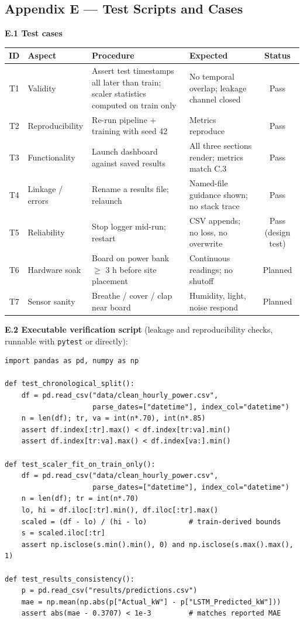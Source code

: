 \documentclass[11pt,a4paper]{article}
\begin{document}
\subsection{Appendix E --- Test Scripts and Cases}
\noindent\textbf{E.1 Test cases}\par\smallskip
\begin{tabular}{|c|l|p{5.6cm}|p{3.4cm}|c|}
\hline
\textbf{ID} & \textbf{Aspect} & \textbf{Procedure} & \textbf{Expected} & \textbf{Status}\\ \hline
T1 & Validity & Assert test timestamps all later than train; scaler statistics computed on train only & No temporal overlap; leakage channel closed & Pass\\ \hline
T2 & Reproducibility & Re-run pipeline $+$ training with seed 42 & Metrics reproduce & Pass\\ \hline
T3 & Functionality & Launch dashboard against saved results & All three sections render; metrics match C.3 & Pass\\ \hline
T4 & Linkage / errors & Rename a results file; relaunch & Named-file guidance shown; no stack trace & Pass\\ \hline
T5 & Reliability & Stop logger mid-run; restart & CSV appends; no loss, no overwrite & Pass (design test)\\ \hline
T6 & Hardware soak & Board on power bank $\geq$ 3 h before site placement & Continuous readings; no shutoff & Planned\\ \hline
T7 & Sensor sanity & Breathe / cover / clap near board & Humidity, light, noise respond & Planned\\ \hline
\end{tabular}
\bigskip

\noindent\textbf{E.2 Executable verification script} (leakage and
reproducibility checks, runnable with \texttt{pytest} or directly):\par
\begin{verbatim}
import pandas as pd, numpy as np

def test_chronological_split():
    df = pd.read_csv("data/clean_hourly_power.csv",
                     parse_dates=["datetime"], index_col="datetime")
    n = len(df); tr, va = int(n*.70), int(n*.85)
    assert df.index[:tr].max() < df.index[tr:va].min()
    assert df.index[tr:va].max() < df.index[va:].min()

def test_scaler_fit_on_train_only():
    df = pd.read_csv("data/clean_hourly_power.csv",
                     parse_dates=["datetime"], index_col="datetime")
    n = len(df); tr = int(n*.70)
    lo, hi = df.iloc[:tr].min(), df.iloc[:tr].max()
    scaled = (df - lo) / (hi - lo)          # train-derived bounds
    s = scaled.iloc[:tr]
    assert np.isclose(s.min().min(), 0) and np.isclose(s.max().max(), 1)

def test_results_consistency():
    p = pd.read_csv("results/predictions.csv")
    mae = np.mean(np.abs(p["Actual_kW"] - p["LSTM_Predicted_kW"]))
    assert abs(mae - 0.3707) < 1e-3         # matches reported MAE
\end{verbatim}
\end{document}
